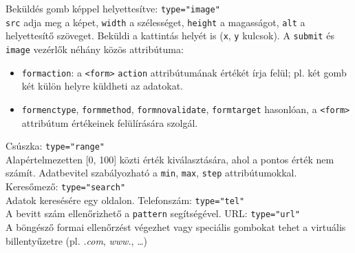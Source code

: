 \begin{frame}
  Beküldés gomb képpel helyettesítve: \texttt{type="image"}\\
  \texttt{src}  adja meg a képet, \texttt{width} a szélességet, 
  \texttt{height} a magasságot, \texttt{alt} a helyettesítő 
  szöveget. Beküldi a kattintás helyét is (\texttt{x}, \texttt{y} 
  kulcsok).
  \vfill
  A \texttt{submit} és \texttt{image} vezérlők néhány közös 
  attribútuma:
  \begin{itemize}
    \item \texttt{formaction}: a \texttt{<form>} \texttt{action} 
    attribútumának értékét írja felül; pl. két gomb két 
    külön helyre küldheti az adatokat.
    \item \texttt{formenctype}, \texttt{formmethod}, 
    \texttt{formnovalidate}, \texttt{formtarget} hasonlóan, a 
    \texttt{<form>} attribútum értékeinek felülírására szolgál.
  \end{itemize}
\end{frame}

\begin{frame}
  Csúszka: \texttt{type="range"}\\
  Alapértelmezetten [0, 100] közti érték kiválasztására, ahol a 
  pontos érték nem számít. Adatbevitel szabályozható a 
  \texttt{min}, \texttt{max}, \texttt{step} attribútumokkal.
  \vfill
  Keresőmező: \texttt{type="search"}\\
  Adatok keresésére egy oldalon.
  \vfill
  Telefonszám: \texttt{type="tel"}\\
  A bevitt szám ellenőrizhető a \texttt{pattern} segítségével.
  \vfill
  URL: \texttt{type="url"}\\
  A böngésző formai ellenőrzést végezhet vagy speciális gombokat 
  tehet a virtuális billentyűzetre (pl. \emph{.com}, \emph{www.}, \dots)
\end{frame}

